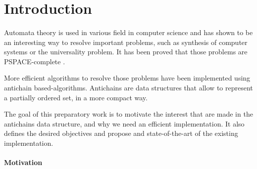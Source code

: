 \documentclass[letterpaper]{article}
\theoremstyle{definition}
\begin{document}
%



\newpage

\tableofcontents

\newpage

\listoftodos

\newpage

\section{Introduction}


\paragraph{}

Automata theory is used in various field in computer science and has shown
to be an interesting way to resolve important problems,
such as synthesis of computer systems
or the universality problem. It has been proved that those problems are
PSPACE-complete \cite{ant_univers}.

More efficient algorithms to resolve those problems have been implemented
using antichain based-algorithms. Antichains are data structures that allow
to represent a partially ordered set, in a more compact way.

The goal of this preparatory work is to motivate the interest that
are made in the antichains data structure, and why we need an efficient
implementation.
It also defines the desired objectives
and propose and state-of-the-art of the existing implementation.

\paragraph{Motivation}
\end{document}

